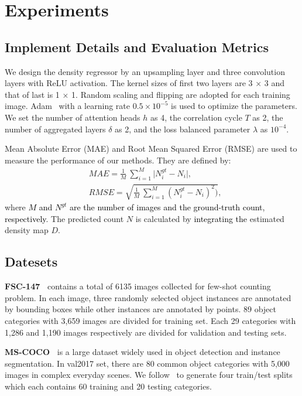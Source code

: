 \documentclass{article}
\newcommand\XP[1]{\textcolor{black}{#1}}\newcommand\XPC[1]{\textcolor{black}{[#1]}}
\begin{document}
\section{Experiments}


\subsection{Implement Details and Evaluation Metrics}
We design the density regressor by an upsampling layer and three convolution layers with ReLU activation. The kernel sizes of first two layers are 3 × 3 and that of last is 1 × 1. Random scaling and flipping are adopt\XP{ed} for each training image. Adam~\cite{kingmaadam} with a learning rate $0.5 \times 10^{-5}$ is used to optimize the parameters. We set the number of attention heads $h$ as 4, the correlation cycle $T$ as 2, the number of aggregated layers $\delta$ as 2, and the loss balanced parameter $\lambda$ as $10^{-4}$.

Mean Absolute Error (MAE) and Root Mean Squared Error (RMSE) are used to measure the performance of our methods. They are defined by: 
\begin{equation}
\begin{aligned}
    &MAE=\frac{1}{M}\ \sum_{i=1}^{M}\big|N_i^{gt}-N_i\big|,\\ &RMSE=\sqrt{\frac{1}{M}\ \sum_{i=1}^{M}(N_i^{gt}-N_i)^2)},
\end{aligned}
\end{equation}
where \XP{$M$ and $N^{gt}$ are the number of images and the ground-truth count, respectively}. The predicted count $N$ is calculated by \XP{integrating the} estimated density map $D$.



\subsection{Datesets}
\noindent \textbf{FSC-147~\cite{ranjan2021learning}} contains a total of 6135 images collected for few-shot counting problem. In each image, three randomly selected object instances are annotated by bounding boxes while other instances are annotated by points. 89 object categories with 3,659 images are divided for training set. Each 29 categories with 1,286 and 1,190 images respectively are divided for validation and testing sets.


\noindent \textbf{MS-COCO~\cite{lin2014microsoft}} is a large dataset widely used in object detection and instance segmentation. In val2017 set, there are 80 common object categories with 5,000 images in complex everyday scenes. We follow~\cite{michaelis2018one} to generate four train/test splits which each contains 60 training and 20 testing categories.
\end{document}
